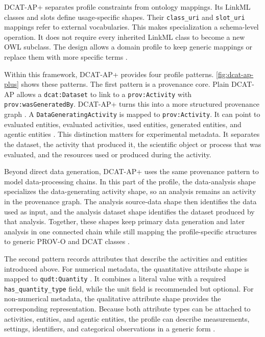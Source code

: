 \ac{DCAT-AP+} separates profile constraints from ontology mappings.
Its \ac{LinkML} classes and slots define usage-specific shapes.
Their \texttt{class\_uri} and \texttt{slot\_uri} mappings refer to external vocabularies.
This makes specialization a schema-level operation.
It does not require every inherited \ac{LinkML} class to become a new \ac{OWL} subclass.
The design allows a domain profile to keep generic mappings or replace them with more specific terms \cite{stroemert2026chemdcat,dcatapplusDocumentation}.

Within this framework, \ac{DCAT-AP+} provides four profile patterns.
\cref{fig:dcat-ap-plus} shows these patterns.
The first pattern is a provenance core.
Plain \ac{DCAT-AP} allows a \texttt{dcat:Dataset} to link to a \texttt{prov:Activity} with \texttt{prov:wasGeneratedBy}.
\ac{DCAT-AP+} turns this into a more structured provenance graph \cite{dcatapplusDocumentation}.
A \texttt{DataGeneratingActivity} is mapped to \texttt{prov:Activity}.
It can point to evaluated entities, evaluated activities, used entities, generated entities, and agentic entities \cite{dcatapplusDocumentation}.
This distinction matters for experimental metadata.
It separates the dataset, the activity that produced it, the scientific object or process that was evaluated, and the resources used or produced during the activity.

Beyond direct data generation, \ac{DCAT-AP+} uses the same provenance pattern to model data-processing chains.
In this part of the profile, the data-analysis shape specializes the data-generating activity shape, so an analysis remains an activity in the provenance graph.
The analysis source-data shape then identifies the data used as input, and the analysis dataset shape identifies the dataset produced by that analysis.
Together, these shapes keep primary data generation and later analysis in one connected chain while still mapping the profile-specific structures to generic \ac{PROV-O} and \ac{DCAT} classes \cite{dcatapplusDocumentation}.

The second pattern records attributes that describe the activities and entities introduced above.
For numerical metadata, the quantitative attribute shape is mapped to \texttt{qudt:Quantity} \cite{qudt2022schema}.
It combines a literal value with a required \texttt{has\_quantity\_type} field, while the unit field is recommended but optional.
For non-numerical metadata, the qualitative attribute shape provides the corresponding representation.
Because both attribute types can be attached to activities, entities, and agentic entities, the profile can describe measurements, settings, identifiers, and categorical observations in a generic form \cite{dcatapplusDocumentation}.

